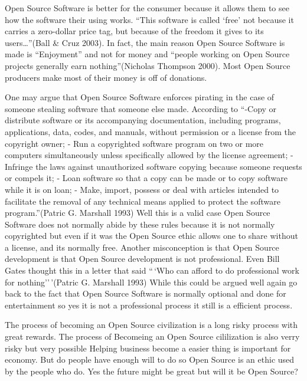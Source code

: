 \documentclass[12pt]{article}
\begin{document}
Open Source Software is better for the consumer because it allows them to see how the
software their using works. ``This software is called `free' not because it carries a zero-dollar
price tag, but because of the freedom it gives to its users\ldots''(Ball \& Cruz 2003). In fact, the
main reason Open Source Software is made is ``Enjoyment'' and not for money and ``people
working on Open Source projects generally earn nothing''(Nicholas Thompson 2000). Most
Open Source producers make most of their money is off of donations.

One may argue that Open Source Software enforces pirating in the case of someone
stealing software that someone else made. According to ``-Copy or distribute software or its
accompanying documentation, including programs, applications, data, codes, and manuals,
without permission or a license from the copyright owner; - Run a copyrighted software
program on two or more computers simultaneously unless specifically allowed by the license
agreement; - Infringe the laws against unauthorized software copying because someone
requests or compels it; - Loan software so that a copy can be made or to copy software while
it is on loan; - Make, import, possess or deal with articles intended to facilitate the removal of
any technical means applied to protect the software program.''(Patric G. Marshall 1993) Well
this is a valid case Open Source Software does not normally abide by these rules because it is
not normally copyrighted but even if it was the Open Source ethic allows one to share without
a license, and its normally free. Another misconception is that Open Source development is
that Open Source development is not professional. Even Bill Gates thought this in a letter
that said ``\,`Who can afford to do professional work for nothing''\,'(Patric G. Marshall 1993)
While this could be argued well again go back to the fact that Open Source Software is
normally optional and done for entertainment so yes it is not a professional process it still is
a efficient process.

The process of becoming an Open Source civilization is a long risky process with great
rewards. The process of Becomeing an Open Source cililization is also verry risky but very
possible Helping business become a easier thing is important for economy. But do people
have enough will to do so Open Source is an ethic used by the people who do. Yes the future
might be great but will it be Open Source?
\end{document}
